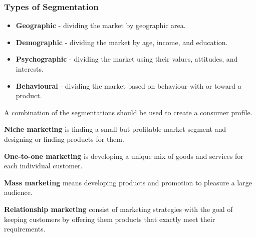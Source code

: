 \documentclass[english, 12pt]{article}
\begin{document}
\subsubsection*{Types of Segmentation}
\begin{itemize}
\item \textbf{Geographic} - dividing the market by geographic area.
\item \textbf{Demographic} - dividing the market by age, income, and education.
\item \textbf{Psychographic} - dividing the market using their values, attitudes, and interests.
\item \textbf{Behavioural} - dividing the market based on behaviour with or toward a product.
\end{itemize}
\begin{note}
A combination of the segmentations should be used to create a consumer profile.
\end{note}
\begin{defn}
\textbf{Niche marketing} is finding a small but profitable market segment and designing or finding products for them.
\end{defn}
\begin{defn}
\textbf{One-to-one marketing} is developing a unique mix of goods and services for each individual customer.
\end{defn}
\begin{defn}
\textbf{Mass marketing} means developing products and promotion to pleasure a large audience.
\end{defn}
\begin{defn}
\textbf{Relationship marketing} consist of marketing strategies with the goal of keeping customers by offering them products that exactly meet their requirements.
\end{defn}
\end{document}
